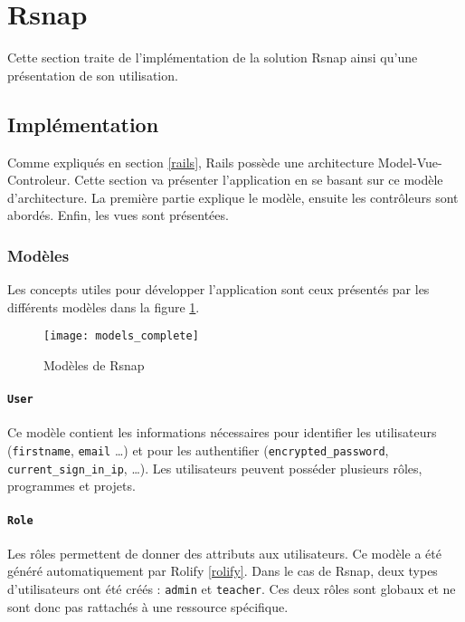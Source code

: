 \section{Rsnap}
\graphicspath{{content/7-solution/3-rsnap/images/}}
Cette section traite de l'implémentation de la solution \gls{Rsnap} ainsi qu'une présentation de son utilisation.

\subsection{Implémentation}
Comme expliqués en section \ref{rails}, Rails possède une architecture Model-Vue-Controleur. Cette section va présenter l'application en se basant sur ce modèle d'architecture. La première partie explique le modèle, ensuite les contrôleurs sont abordés. Enfin, les vues sont présentées.

\subsubsection{Modèles}
Les concepts utiles pour développer l'application sont ceux présentés par les différents modèles dans la figure \ref{fig:models}.

\begin{figure}
 \begin{center}
   \texttt{[image: models\_complete]}
   \caption{Modèles de Rsnap}
   \label{fig:models}
 \end{center}
\end{figure}

\paragraph{\texttt{User}} Ce modèle contient les informations nécessaires pour identifier les utilisateurs (\texttt{firstname}, \texttt{email} \ldots) et pour les authentifier (\texttt{encrypted\_password}, \texttt{current\_sign\_in\_ip}, \ldots). Les utilisateurs peuvent posséder plusieurs rôles, programmes et projets.

\paragraph{\texttt{Role}} Les rôles permettent de donner des attributs aux utilisateurs. Ce modèle a été généré automatiquement par Rolify \ref{rolify}. Dans le cas de \gls{Rsnap}, deux types d'utilisateurs ont été créés : \texttt{admin} et \texttt{teacher}. Ces deux rôles sont globaux et ne sont donc pas rattachés à une ressource spécifique.


